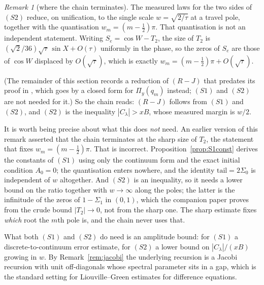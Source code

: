 \documentclass[11pt]{article}
\theoremstyle{definition}
\theoremstyle{remark}
\newtheorem{remark}[theorem]{Remark}
\theoremstyle{definition}
\begin{document}
\begin{remark}[where the chain terminates]\label{rem:chainend}
The measured laws for the two sides of $(S2)$ reduce, on unification, to the single scale
$w=\sqrt{2/\tau}$ at a travel pole, together with the quantisation $w_m=(m-\tfrac12)\pi$. That
quantisation is not an independent statement. Writing $S_e=\cos W-T_2$, the size of $T_2$ is
$(\sqrt2/36)\sqrt\tau\,\sin X+O(\tau)$ uniformly in the phase, so the zeros of $S_e$ are those of
$\cos W$ displaced by $O(\sqrt\tau)$, which is exactly $w_m=(m-\tfrac12)\pi+O(\sqrt\tau)$.

(The remainder of this section records a reduction of $(R\!-\!J)$ that predates its proof in
\cite{paper2}, which goes by a closed form for $\Pi_y(q_m)$ instead; $(S1)$ and $(S2)$ are not
needed for it.) So the chain reads: $(R\!-\!J)$ follows from $(S1)$ and $(S2)$, and $(S2)$ is the inequality
$|C_\lambda|>xB$, whose measured margin is $w/2$.

It is worth being precise about what this does \emph{not} need. An earlier version of this remark
asserted that the chain terminates at the sharp size of $T_2$, the statement that fixes
$w_m=(m-\tfrac12)\pi$. That is incorrect. Proposition~\ref{prop:S1const} derives the constants of
$(S1)$ using only the continuum form and the exact initial condition $A_0=0$; the quantisation
enters nowhere, and the identity $\mathrm{tail}=2\Sigma_0$ is independent of $w$ altogether. And
$(S2)$ is an inequality, so it needs a lower bound on the ratio together with $w\to\infty$ along
the poles; the latter is the infinitude of the zeros of $1-\Sigma_1$ in $(0,1)$, which the
companion paper proves from the crude bound $|T_2|\to0$, not from the sharp one. The sharp
estimate fixes \emph{which} root the $m$th pole is, and the chain never uses that.

What both $(S1)$ and $(S2)$ do need is an amplitude bound: for $(S1)$ a discrete-to-continuum
error estimate, for $(S2)$ a lower bound on $|C_\lambda|/(xB)$ growing in $w$. By
Remark~\ref{rem:jacobi} the underlying recursion is a Jacobi recursion with unit off-diagonals
whose spectral parameter sits in a gap, which is the standard setting for Liouville--Green
estimates for difference equations.
\end{remark}
\end{document}
